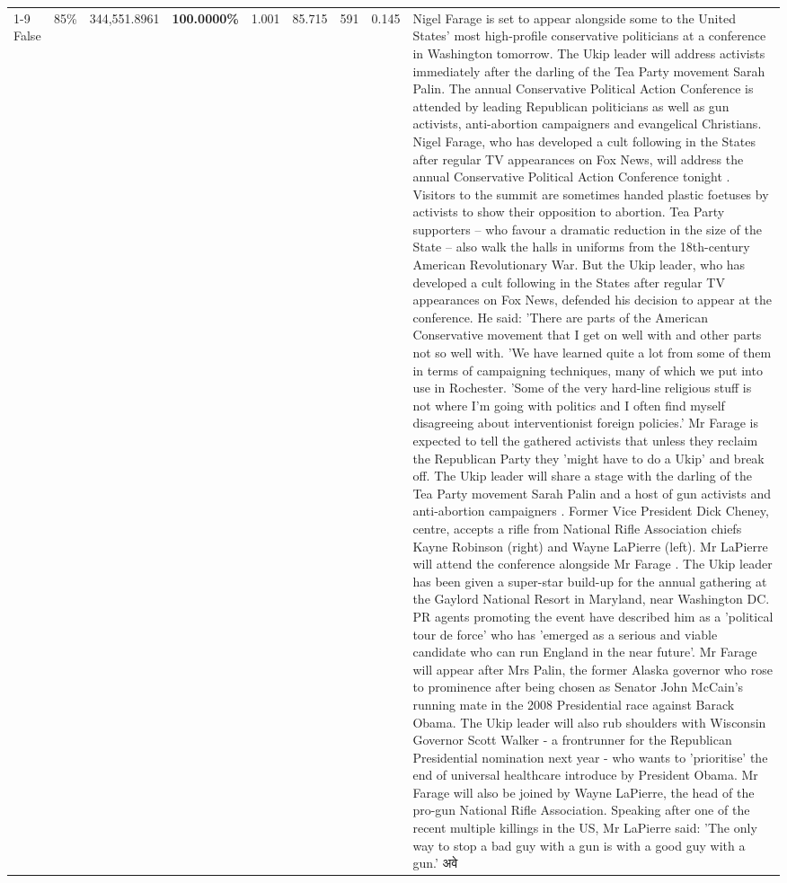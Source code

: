 \begin{table}[H]
\begin{tabular}{lllrlllll}
\cline{1-9} \cline{2-9}
False & 85\% & 344,551.8961 & \bfseries \color{red} 100.0000\% & 1.001 & 85.715 & 591 & 0.145 & Nigel Farage is set to appear alongside some to the United States' most high-profile conservative politicians at a conference in Washington tomorrow. The Ukip leader will address activists immediately after the darling of the Tea Party movement Sarah Palin. The annual Conservative Political Action Conference is attended by leading Republican politicians as well as gun activists, anti-abortion campaigners and evangelical Christians. Nigel Farage, who has developed a cult following in the States after regular TV appearances on Fox News, will address the annual Conservative Political Action Conference tonight . Visitors to the summit are sometimes handed plastic foetuses by activists to show their opposition to abortion. Tea Party supporters – who favour a dramatic reduction in the size of the State – also walk the halls in uniforms from the 18th-century American Revolutionary War. But the Ukip leader, who has developed a cult following in the States after regular TV appearances on Fox News, defended his decision to appear at the conference. He said: 'There are parts of the American Conservative movement that I get on well with and other parts not so well with. 'We have learned quite a lot from some of them in terms of campaigning techniques, many of which we put into use in Rochester. 'Some of the very hard-line religious stuff is not where I'm going with politics and I often find myself disagreeing about interventionist foreign policies.' Mr Farage is expected to tell the gathered activists that unless they reclaim the Republican Party they 'might have to do a Ukip' and break off. The Ukip leader will share a stage with the darling of the Tea Party movement Sarah Palin and a host of gun activists and anti-abortion campaigners . Former Vice President Dick Cheney, centre, accepts a rifle from National Rifle Association chiefs Kayne Robinson (right) and Wayne LaPierre (left). Mr LaPierre will attend the conference alongside Mr Farage . The Ukip leader has been given a super-star build-up for the annual gathering at the Gaylord National Resort in Maryland, near Washington DC. PR agents promoting the event have described him as a 'political tour de force' who has 'emerged as a serious and viable candidate who can run England in the near future'. Mr Farage will appear after Mrs Palin, the former Alaska governor who rose to prominence after being chosen as Senator John McCain's running mate in the 2008 Presidential race against Barack Obama. The Ukip leader will also rub shoulders with Wisconsin Governor Scott Walker - a frontrunner for the Republican Presidential nomination next year - who wants to 'prioritise' the end of universal healthcare introduce by President Obama. Mr Farage will also be joined by Wayne LaPierre, the head of the pro-gun National Rifle Association. Speaking after one of the recent multiple killings in the US, Mr LaPierre said: 'The only way to stop a bad guy with a gun is with a good guy with a gun.' अवे \\

\end{tabular}
\end{table}
